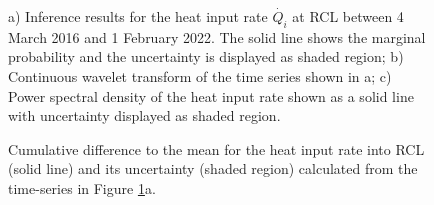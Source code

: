 \documentclass[doublespacing, linenumbers]{bmcart}
\def\texttt{[image: ]}
\begin{document}
\begin{backmatter}
\begin{figure}[h!]
    \caption{ a) Inference results for the heat input rate $\dot{Q_i}$ at RCL
             between 4 March 2016 and 1 February 2022. The solid line shows the
             marginal probability and the uncertainty is displayed as shaded
             region; b) Continuous wavelet transform of the time series shown in
             a; c) Power spectral density of the heat input rate shown as a
             solid line with uncertainty displayed as shaded region.}
\label{inference_result}
\end{figure}

\begin{figure}[h!]
    \caption{Cumulative difference to the mean for the heat input rate into RCL
             (solid line) and its uncertainty (shaded region) calculated from
             the time-series in Figure \ref{inference_result}a.} 
\label{cumulative}
\end{figure}







\end{backmatter}
\end{document}
